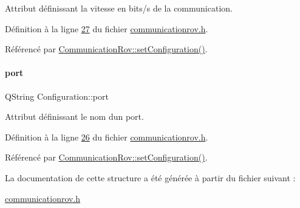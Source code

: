 Attribut définissant la vitesse en bits/s de la communication. 



Définition à la ligne \hyperlink{communicationrov_8h_source_l00027}{27} du fichier \hyperlink{communicationrov_8h_source}{communicationrov.\+h}.



Référencé par \hyperlink{communicationrov_8cpp_source_l00050}{Communication\+Rov\+::set\+Configuration()}.

\mbox{\label{struct_configuration_acc40b4f298cb215a94fb43976ef7d3a8}} 
\paragraph{\texorpdfstring{port}{port}}
{\footnotesize\ttfamily Q\+String Configuration\+::port}



Attribut définissant le nom d\textquotesingle{}un port. 



Définition à la ligne \hyperlink{communicationrov_8h_source_l00026}{26} du fichier \hyperlink{communicationrov_8h_source}{communicationrov.\+h}.



Référencé par \hyperlink{communicationrov_8cpp_source_l00050}{Communication\+Rov\+::set\+Configuration()}.



La documentation de cette structure a été générée à partir du fichier suivant \+:\begin{DoxyCompactItemize}
\item 
\hyperlink{communicationrov_8h}{communicationrov.\+h}\end{DoxyCompactItemize}

